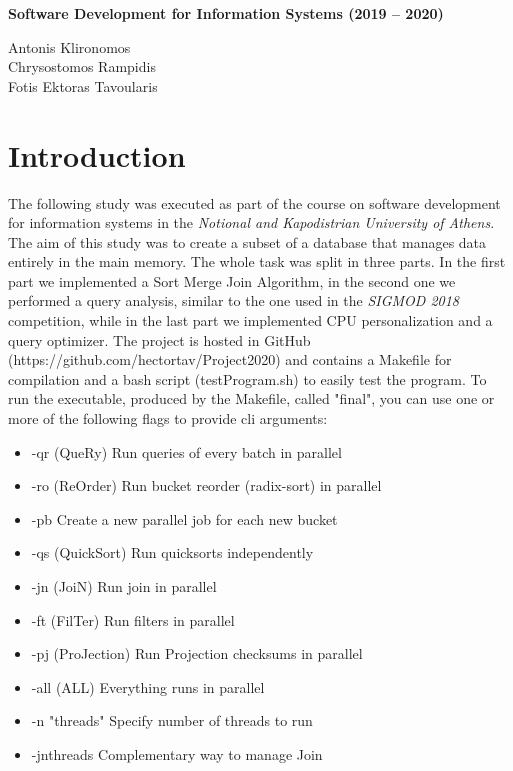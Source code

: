 \documentclass{ws-ijprai}
\begin{document}
\catchline{}{}{}{}{}
%
\begin{titlepage}
    \centering

    \vspace*{0.5cm}

    \huge\bfseries
    Software Development for Information Systems (2019 – 2020)
    \vspace*{\fill}
    \vspace*{0.5cm}

    \large Antonis Klironomos\\[0.1in]Chrysostomos Rampidis\\[0.1in]Fotis Ektoras Tavoularis

    \vspace*{\fill}
\end{titlepage}
\clearpage
\tableofcontents
\clearpage
\newcommand\tab[1][1cm]{\hspace*{#1}}

\section{Introduction}


\tab The following study was executed as part of the course on software development for information systems in the {\it Notional and Kapodistrian University of Athens}. The aim of this study was to create a subset of a database that manages data entirely in the main memory. The whole task was split in three parts. In the first part we implemented a Sort Merge Join Algorithm, in the second one we performed a query analysis, similar to the one used in the {\it SIGMOD 2018} competition, while in the last part we implemented CPU personalization and a query optimizer.
\tab The project is hosted in GitHub (https://github.com/hectortav/Project2020) and contains a Makefile for compilation
and a bash script (testProgram.sh) to easily test the program. To run the executable, produced by the Makefile,
called "final", you can use one or more of the following flags to provide cli arguments:

\begin{itemize}
    \item -qr (QueRy)
	    Run queries of every batch in parallel
    \item -ro (ReOrder)
	Run bucket reorder (radix-sort) in parallel
    \item -pb Create a new parallel job for each new bucket
    \item -qs (QuickSort) Run quicksorts independently
    \item -jn (JoiN)
        Run join in parallel
    \item -ft (FilTer) 
        Run filters in parallel
    \item -pj (ProJection)
        Run Projection checksums in parallel
    \item -all (ALL) 
        Everything runs in parallel
    \item -n "threads"                        
        Specify number of threads to run
\item -jnthreads Complementary way to manage Join
 \end{itemize}
\end{document}
